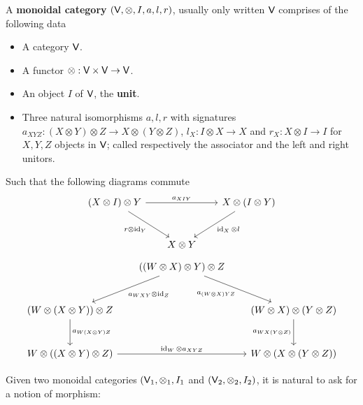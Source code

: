 \documentclass[10pt,a4paper]{article}
\newcommand{\cat}[1]{\textcat{#1}}
\newcommand{\textcat}[1]{{\normalfont\textsf{#1}}}
\DeclareMathOperator{\id}{id}
\theoremstyle{plain}
\theoremstyle{definition}
\theoremstyle{remark}
\begin{document}
\begin{definition}
    A \textbf{monoidal category} $(\cat{V}, \otimes, I, a, l, r)$, usually only written $\cat{V}$ comprises of the following data
    \begin{itemize}
        \item A category $\cat{V}$.
        \item A functor $\otimes:\cat{V}\times\cat{V} \to \cat{V}$.
        \item An object $I$ of $\cat{V}$, the \textbf{unit}.
        \item Three natural isomorphisms $a, l, r$ with signatures $a_{XYZ} : (X \otimes Y) \otimes Z \to X \otimes (Y \otimes Z)$, $l_X : I \otimes X \to X$ and $r_X : X \otimes I \to I$ for $X, Y, Z$ objects in $\cat{V}$; called respectively the associator and the left and right unitors.
    \end{itemize}
    Such that the following diagrams commute
    \[\begin{tikzcd}[sep=scriptsize]
        {(X \otimes I) \otimes Y} \ar[rr, "a_{XIY}"]
        \ar[rdd, "r \otimes \id_Y"'] && {X \otimes (I \otimes Y)}
        \ar[ldd, "\id_X \otimes l"]\\
        \\
        & {X \otimes Y}
    \end{tikzcd}\]
    \[\begin{tikzcd}[sep=scriptsize]
        & {((W \otimes X) \otimes Y) \otimes Z} & \\
        \\
        {(W \otimes (X \otimes Y)) \otimes Z} && {(W \otimes X) \otimes (Y \otimes Z)} \\
        \\
        {W \otimes ((X \otimes Y) \otimes Z)} && {W \otimes (X \otimes (Y \otimes Z))}
        \arrow["{a_{WXY} \otimes \id_Z}", from=1-2, to=3-1]
        \arrow["{a_{(W \otimes X)YZ}}"', from=1-2, to=3-3]
        \arrow["{a_{W(X \otimes Y)Z}}", from=3-1, to=5-1]
        \arrow["{a_{WX(Y \otimes Z)}}"', from=3-3, to=5-3]
        \arrow["{\id_W \otimes a_{XYZ}}", from=5-1, to=5-3]
    \end{tikzcd}\]
\end{definition}

Given two monoidal categories $(\cat V_1, \otimes_1, I_1$ and $(\cat V_2, \otimes_2, I_2)$, it is natural to ask for a notion of morphism:
\end{document}
